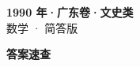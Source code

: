 \documentclass[zihao=-4, a4paper]{ctexart}
\begin{document}
\begin{center}
  {\Large\bfseries 1990 年·广东卷·文史类}\\[4pt]
  {\large 数学 · 简答版}
\end{center}
\medskip
{}

\clearpage
{}
\begin{center}{\Large\bfseries 答案速查}\end{center}
\medskip

\end{document}
